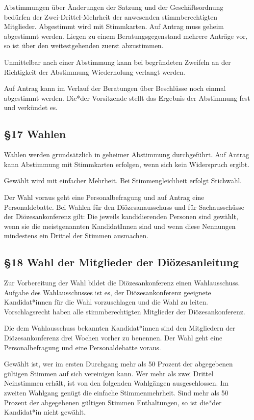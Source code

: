 \documentclass[12pt]{report}
\begin{document}
\begin{flushleft}
Abstimmungen über Änderungen der Satzung und der Geschäftsordnung bedürfen der
Zwei-Drittel-Mehrheit der anwesenden stimmberechtigten Mitglieder. Abgestimmt wird mit Stimmkarten.
Auf Antrag muss geheim abgestimmt werden.
Liegen zu einem Beratungsgegenstand mehrere Anträge vor, so ist über den weitestgehenden zuerst abzustimmen.

Unmittelbar nach einer Abstimmung kann bei begründeten Zweifeln an der Richtigkeit der Abstimmung 
Wiederholung verlangt werden.

Auf Antrag kann im Verlauf der Beratungen über Beschlüsse noch einmal abgestimmt werden.
{\color{red}Die*der} Vorsitzende stellt das Ergebnis der Abstimmung fest und verkündet es.

\subsection*{§17 Wahlen}
Wahlen werden grundsätzlich in geheimer Abstimmung durchgeführt. Auf Antrag kann Abstimmung mit
Stimmkarten erfolgen, wenn sich kein Widerspruch ergibt.

Gewählt wird mit einfacher Mehrheit. Bei Stimmengleichheit erfolgt Stichwahl.

Der Wahl voraus geht eine Personalbefragung und auf Antrag eine Personaldebatte. Bei Wahlen für den 
Diözesanausschuss und für Sachausschüsse der Diözesankonferenz gilt: Die jeweils kandidierenden Personen
sind gewählt, wenn sie die meistgenannten KandidatInnen sind und wenn diese Nennungen mindestens ein
Drittel der Stimmen ausmachen.

\subsection*{§18 Wahl der Mitglieder der Diözesanleitung}
Zur Vorbereitung der Wahl bildet die Diözesankonferenz einen Wahlausschuss. Aufgabe des Wahlausschusses
ist es, der Diözesankonferenz geeignete {\color{red}Kandidat*innen} für die Wahl vorzuschlagen und die Wahl zu leiten.
Vorschlagsrecht haben alle stimmberechtigten Mitglieder der Diözesankonferenz.

Die dem Wahlausschuss bekannten {\color{red}Kandidat*innen} sind den Mitgliedern der Diözesankonferenz drei Wochen
vorher zu benennen. Der Wahl geht eine Personalbefragung und eine Personaldebatte voraus.

Gewählt ist, wer im ersten Durchgang mehr als 50 Prozent der abgegebenen gültigen Stimmen auf sich 
vereinigen kann. Wer mehr als zwei Drittel Neinstimmen erhält, ist von den folgenden Wahlgängen ausgeschlossen. 
Im zweiten Wahlgang genügt die einfache Stimmenmehrheit. Sind mehr als 50 Prozent der abgegebenen
gültigen Stimmen Enthaltungen, so ist {\color{red}die*der Kandidat*in} nicht gewählt.


\end{flushleft}
\end{document}
